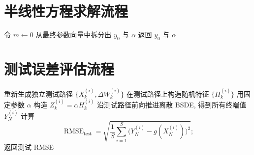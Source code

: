  \section{半线性方程求解流程}\label{sec:app_semilinear_method}
    \begin{algorithm}[htbp]
      \SetAlgoLined
      令 $m \leftarrow 0$\;
      从最终参数向量中拆分出 $y_{0}$ 与 $\alpha$\;
      返回 $y_{0}$ 与 $\alpha$\;
      \caption{半线性方程的 LM 求解流程}
      \label{alg:semilinear}
    \end{algorithm}

    \newpage

  \section{测试误差评估流程}\label{sec:app_test_method}
    \begin{algorithm}[htbp]
      \SetAlgoLined
      重新生成独立测试路径 $\{X_{k}^{(i)}, \Delta W_{k}^{(i)}\}$\;
      在测试路径上构造随机特征 $\{H_{k}^{(i)}\}$\;
      用固定参数 $\alpha$ 构造 $Z_{k}^{(i)} = \alpha H_{k}^{(i)}$\;
      沿测试路径前向推进离散 BSDE, 得到所有终端值 $Y_{N}^{(i)}$\;
      计算
      \begin{equation*}
        \operatorname{RMSE}_{\text{test}}
        =
        \sqrt{
          \frac{1}{S}
          \sum_{i = 1}^{S}
          \bigl(
          Y_{N}^{(i)} - g(X_{N}^{(i)})
          \bigr)^{2}
        };
      \end{equation*}
      返回测试 RMSE\;
      \caption{测试误差评估流程}
      \label{alg:test}
    \end{algorithm}
